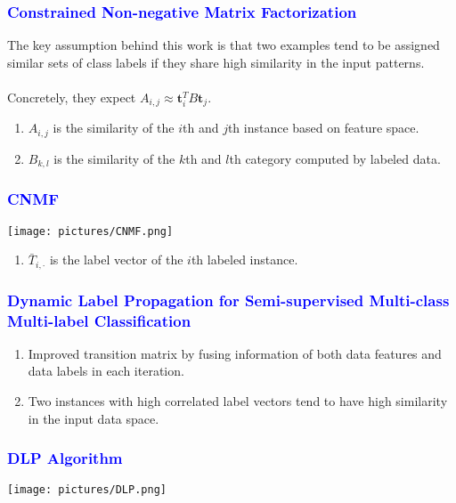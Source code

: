 \documentclass{beamer}
\begin{document}
\begin{frame}
\frametitle{\textcolor{blue}{Constrained Non-negative Matrix Factorization}}
The key assumption behind this work is that two examples tend to be assigned similar sets of class labels if
they share high similarity in the input patterns.\\
~\\
Concretely, they expect $A_{i,j} \approx \textbf{t}_i^TB\textbf{t}_j$.
\begin{enumerate}
\item $A_{i,j}$ is the similarity of the $i$th and $j$th instance based on feature space.\\
\item $B_{k,l}$ is the similarity of the $k$th and $l$th category computed by labeled data.\\
\end{enumerate}
\end{frame}

\begin{frame}
\frametitle{\textcolor{blue}{CNMF}}
\texttt{[image: pictures/CNMF.png]}

\begin{enumerate}

\item $\bar{T}_{i, \cdot}$ is the label vector of the $i$th labeled instance.  
\end{enumerate}
\end{frame}

\begin{frame}
\frametitle{\textcolor{blue}{Dynamic Label Propagation for Semi-supervised Multi-class Multi-label Classification}}
 \begin{enumerate}
\item Improved transition matrix by fusing information of both data features and data labels in each iteration. 
~\\
\item Two instances with high correlated label vectors tend to have high similarity in the input data space.

\end{enumerate}
\end{frame}

\begin{frame}
\frametitle{\textcolor{blue}{DLP Algorithm}}
\texttt{[image: pictures/DLP.png]}
\end{frame}
\end{document}
